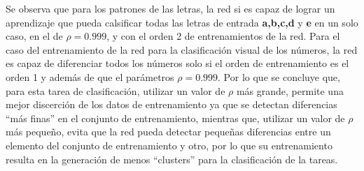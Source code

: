 Se observa que para los patrones de las letras, la red si es capaz de lograr un aprendizaje que pueda
calsificar todas las letras de entrada \textbf{a,b,c,d} y \textbf{e} en un solo caso, en el de $\rho=0.999$,
y con el orden 2 de entrenamientos de la red.
Para el caso del entrenamiento de la red para la clasificación visual de los números, la red es capaz
de diferenciar todos los números solo si el orden de entrenamiento es el orden 1 y además de que el
parámetros $\rho=0.999$.
Por lo que se concluye que, para esta tarea de clasificación, utilizar un valor de $\rho$ más grande, permite
una mejor discerción de los datos de entrenamiento ya que se detectan diferencias ``más finas'' en el
conjunto de entrenamiento, mientras que, utilizar un valor de $\rho$ más pequeño, evita que la red pueda
detectar pequeñas diferencias entre un elemento del conjunto de entrenamiento y otro, por lo que su entrenamiento
resulta en la generación de menos ``clusters'' para la clasificación de la tareas.